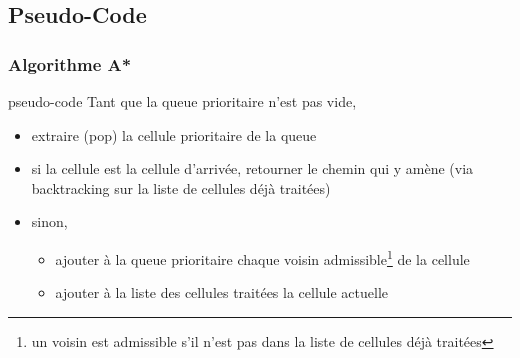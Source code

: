 \documentclass{beamer}
\begin{document}
\subsection{Pseudo-Code}
\begin{frame}
  \frametitle{Algorithme A*}
  \begin{block}{pseudo-code}
    Tant que la queue prioritaire n'est pas vide,
    \begin{itemize}
    \item<2-> extraire (pop) la cellule prioritaire de la queue
    \item<3-> si la cellule est la cellule d'arrivée, retourner le chemin qui y amène
          (via backtracking sur la liste de cellules déjà traitées)
    \item<4-> sinon,
      \begin{itemize}
      \item<4-> ajouter à la queue prioritaire chaque voisin admissible\footnote{un
          voisin est admissible s'il n'est pas dans la liste de cellules déjà
          traitées} de la cellule
      \item<5-> ajouter à la liste des cellules traitées la cellule actuelle
      \end{itemize}
    \end{itemize}    
  \end{block}
\end{frame}
\end{document}
